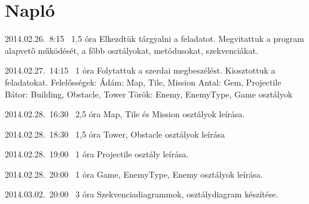%
\section{Napló}

\begin{naplo}

\bejegyzes
{2014.02.26.~8:15~} %
{1,5 óra} %
{\vadam\newline
\vantal\newline
\vbator\newline
\vtorok}
{Elkezdtük tárgyalni a feladatot. Megvitattuk a program alapvető működését, a főbb osztályokat, metódusokat, szekvenciákat.}

\bejegyzes
{2014.02.27.~14:15~}
{1 óra}
{\vadam\newline
\vantal\newline
\vbator\newline
\vtorok}
{Folytattuk a szerdai megbeszélést. Kiosztottuk a feladatokat. \newline Felelősségek: \newline
Ádám: Map, Tile, Mission \newline
Antal: Gem, Projectile \newline
Bátor: Building, Obstacle, Tower \newline
Török: Enemy, EnemyType, Game \newline osztályok}

\bejegyzes
{2014.02.28.~16:30~}
{2,5 óra}
{\vadam}
{Map, Tile és Mission osztályok leírása.}

\bejegyzes
{2014.02.28.~18:30~}
{1,5 óra}
{\vbator}
{Tower, Obstacle osztályok leírása}

\bejegyzes
{2014.02.28.~19:00~}
{1 óra}
{\vantal}
{Projectile osztály leírása.}

\bejegyzes
{2014.02.28.~20:00~}
{1 óra}
{\vtorok}
{Game, EnemyType, Enemy osztályok leírása.}

\bejegyzes
{2014.03.02.~20:00~}
{3 óra}
{\vbator}
{Szekvenciadiagrammok, osztálydiagram készítése. }

\end{naplo}

